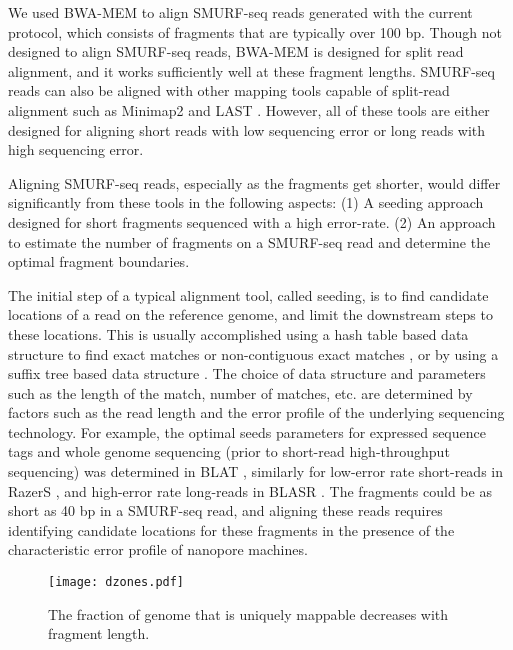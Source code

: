 We used BWA-MEM \citep{li2013aligning} to align SMURF-seq reads generated
with the current protocol, which consists of fragments that are
typically over 100 bp. Though not designed to align SMURF-seq reads,
BWA-MEM is designed for split read alignment, and it works sufficiently
well at these fragment lengths.  SMURF-seq reads can also be aligned
with other mapping tools capable of split-read alignment such as
Minimap2 \citep{li2018minimap2} and LAST \citep{kielbasa2011adaptive}.
However, all of these tools are either designed for aligning short reads
with low sequencing error or long reads with high sequencing error.

Aligning SMURF-seq reads, especially as the fragments get shorter, would
differ significantly from these tools in the following aspects: (1) A
seeding approach designed for short fragments sequenced with a high
error-rate.  (2) An approach to estimate the number of fragments on a
SMURF-seq read and determine the optimal fragment boundaries.

The initial step of a typical alignment tool, called seeding, is to find
candidate locations of a read on the reference genome, and limit the
downstream steps to these locations.
%
This is usually accomplished using a hash table based data structure to
find exact matches
\citep{altschul1990basic,altschul1997gapped,kent2002blat} or
non-contiguous exact matches \citep{ma2002patternhunter,chen2009perm},
or by using a suffix tree based data structure
\citep{kurtz2004versatile,langmead2009ultrafast,li2009fast,
li2010fast,li2013aligning}.
%
The choice of data structure and parameters such as the length of the
match, number of matches, etc. are determined by factors such as
the read length and the error profile of the underlying sequencing
technology.
%
For example, the optimal seeds parameters for expressed sequence tags
and whole genome sequencing (prior to short-read high-throughput
sequencing) was determined in BLAT \citep{kent2002blat}, similarly for
low-error rate short-reads in RazerS \citep{weese2009razers}, and
high-error rate long-reads in BLASR \citep{chaisson2012mapping}.
%
The fragments could be as short as 40 bp in a SMURF-seq read, and
aligning these reads requires identifying candidate locations for these
fragments in the presence of the characteristic error profile of
nanopore machines.

\begin{figure}[t!]
\centering
\texttt{[image: dzones.pdf]}
\caption[Uniquely mappable fraction of the genome decreases fragment
  length]{
  The fraction of genome that is uniquely mappable decreases with
  fragment length.}
\label{dzones}
\end{figure}

